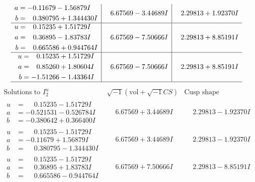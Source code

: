 \documentclass[1p]{elsarticle_modified}
\theoremstyle{definition}
\newcommand{\I}{\sqrt{-1}}
\begin{document}
$$\begin{array}{c|c|c}
\begin{aligned}
a &= -0.11679 - 1.56879 I \\
b &= \phantom{-}0.380795 + 1.344430 I\end{aligned}
 & \phantom{-}6.67569 - 3.44689 I & \phantom{-}2.29813 + 1.92370 I \\ \hline\begin{aligned}
u &= \phantom{-}0.15235 + 1.51729 I \\
a &= \phantom{-}0.36895 - 1.83783 I \\
b &= \phantom{-}0.665586 + 0.944764 I\end{aligned}
 & \phantom{-}6.67569 - 7.50666 I & \phantom{-}2.29813 + 8.85191 I \\ \hline\begin{aligned}
u &= \phantom{-}0.15235 + 1.51729 I \\
a &= \phantom{-}0.85260 + 1.80604 I \\
b &= -1.51266 - 1.43364 I\end{aligned}
 & \phantom{-}6.67569 - 7.50666 I & \phantom{-}2.29813 + 8.85191 I\\
 \hline 
 \end{array}$$\newpage$$\begin{array}{c|c|c}  
\text{Solutions to }I^u_{2}& \I (\text{vol} + \sqrt{-1}CS) & \text{Cusp shape}\\
 \hline 
\begin{aligned}
u &= \phantom{-}0.15235 - 1.51729 I \\
a &= -0.521531 - 0.526784 I \\
b &= -0.380642 + 0.366400 I\end{aligned}
 & \phantom{-}6.67569 + 3.44689 I & \phantom{-}2.29813 - 1.92370 I \\ \hline\begin{aligned}
u &= \phantom{-}0.15235 - 1.51729 I \\
a &= -0.11679 + 1.56879 I \\
b &= \phantom{-}0.380795 - 1.344430 I\end{aligned}
 & \phantom{-}6.67569 + 3.44689 I & \phantom{-}2.29813 - 1.92370 I \\ \hline\begin{aligned}
u &= \phantom{-}0.15235 - 1.51729 I \\
a &= \phantom{-}0.36895 + 1.83783 I \\
b &= \phantom{-}0.665586 - 0.944764 I\end{aligned}
 & \phantom{-}6.67569 + 7.50666 I & \phantom{-}2.29813 - 8.85191 I \\ \hline\begin{aligned}

\end{aligned}
\end{array}$$
\end{document}
